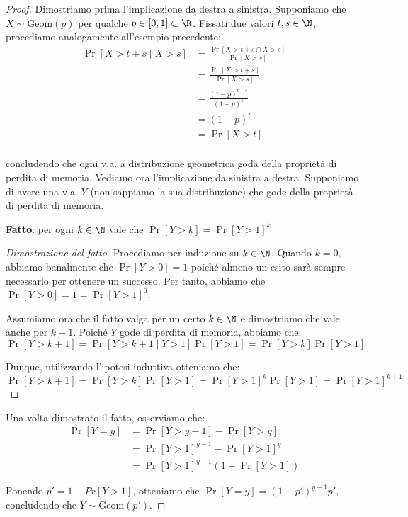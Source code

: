 \documentclass[a4paper, 12pt]{report}
\begin{document}
    \begin{proof}
        Dimostriamo prima l'implicazione da destra a sinistra. Supponiamo che $X \sim \mathrm{Geom}(p)$ per qualche $p \in [0,1] \subset \R$. Fissati due valori $t,s \in \N$, procediamo analogamente all'esempio precedente:
        \[\begin{split}
            \Pr[X > t+s \mid X > s] &= \frac{\Pr[X > t+s \cap X > s]}{\Pr[X > s]} \\
            &= \frac{\Pr[X > t+s]}{\Pr[X > s]} \\
            &= \frac{(1-p)^{t+s}}{(1-p)^s} \\
            &= (1-p)^t \\
            &= \Pr[X > t] \\
        \end{split}\]

        concludendo che ogni v.a. a distribuzione geometrica goda della proprietà di perdita di memoria. Vediamo ora l'implicazione da sinistra a destra. Supponiamo di avere una v.a. $Y$ (non sappiamo la sua distribuzione) che gode della proprietà di perdita di memoria.

        \textbf{Fatto}: per ogni $k \in \N$ vale che $\Pr[Y > k] = \Pr[Y > 1]^k$

        \begin{proof}[Dimostrazione del fatto]
            Procediamo per induzione su $k \in \N$. Quando $k = 0$, abbiamo banalmente che $\Pr[Y > 0] = 1$ poiché almeno un esito sarà sempre necessario per ottenere un successo. Per tanto, abbiamo che $\Pr[Y > 0] = 1 = \Pr[Y > 1]^0$. 

            Assumiamo ora che il fatto valga per un certo $k \in \N$ e dimostriamo che vale anche per $k+1$. Poiché $Y$ gode di perdita di memoria, abbiamo che:
            \[\Pr[Y > k+1] = \Pr[Y > k+1 \mid Y > 1] \Pr[Y > 1]= \Pr[Y > k] \Pr[Y > 1]\]

            Dunque, utilizzando l'ipotesi induttiva otteniamo che:
            \[\Pr[Y > k+1] = \Pr[Y > k] \Pr[Y > 1] = \Pr[Y > 1]^k \Pr[Y > 1] = \Pr[Y > 1]^{k+1}\]
        \end{proof}

        Una volta dimostrato il fatto, osserviamo che:
        \[\begin{split}
            \Pr[Y = y] &= \Pr[Y > y-1] - \Pr[Y > y] \\
            &= \Pr[Y > 1]^{y-1} - \Pr[Y > 1]^y \\
            &= \Pr[Y > 1]^{y-1} (1- \Pr[Y > 1])
        \end{split}\]

        Ponendo $p' = 1-Pr[Y > 1]$, otteniamo che $\Pr[Y = y] = (1-p')^{y-1}p'$, concludendo che $Y \sim \mathrm{Geom}(p')$.
    \end{proof}
\end{document}
